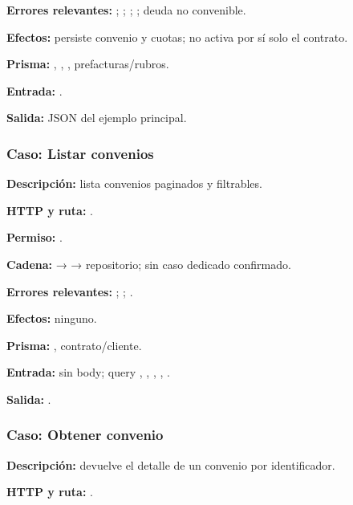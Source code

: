\textbf{Errores relevantes:} \texttt{}; \texttt{}; \texttt{}; \texttt{}; deuda no convenible.  

\textbf{Efectos:} persiste convenio y cuotas; no activa por sí solo el contrato.  

\textbf{Prisma:} \texttt{}, \texttt{}, \texttt{}, prefacturas/rubros.  

\textbf{Entrada:} \texttt{}.  

\textbf{Salida:} JSON del ejemplo principal.


\subsubsection{Caso: Listar convenios}


\textbf{Descripción:} lista convenios paginados y filtrables.  

\textbf{HTTP y ruta:} \texttt{}.  

\textbf{Permiso:} \texttt{}.  

\textbf{Cadena:} \texttt{} → \texttt{} → repositorio; sin caso dedicado confirmado.  

\textbf{Errores relevantes:} \texttt{}; \texttt{}; \texttt{}.  

\textbf{Efectos:} ninguno.  

\textbf{Prisma:} \texttt{}, contrato/cliente.  

\textbf{Entrada:} sin body; query \texttt{}, \texttt{}, \texttt{}, \texttt{}, \texttt{}.  

\textbf{Salida:} \texttt{}.


\subsubsection{Caso: Obtener convenio}


\textbf{Descripción:} devuelve el detalle de un convenio por identificador.  

\textbf{HTTP y ruta:} \texttt{}.  

